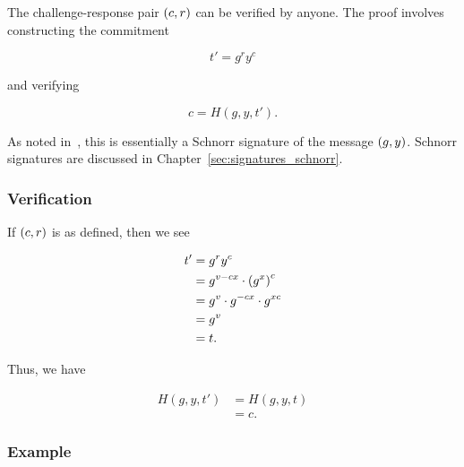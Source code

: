 The challenge-response pair $\left( c,r \right)$ can be verified by anyone.
The proof involves constructing the commitment

\begin{equation}
    t' = g^{r}y^{c}
\end{equation}

\noindent
and verifying

\begin{equation}
    c = H(g,y,t').
\end{equation}

\noindent
As noted in~\cite{GeneralDiscreteLogProofs},
this is essentially a Schnorr signature of the message $\left( g,y \right)$.
Schnorr signatures are discussed in Chapter~\ref{sec:signatures_schnorr}.

\subsubsection{Verification}

If $\left( c,r \right)$ is as defined, then we see

\begin{align}
    t' &= g^{r}y^{c}
            \nonumber\\
        &= g^{v-cx}\cdot\left( g^{x} \right)^{c}
            \nonumber\\
        &= g^{v}\cdot g^{-cx}\cdot g^{xc}
            \nonumber\\
        &= g^{v}
            \nonumber\\
        &= t.
\end{align}

\noindent
Thus, we have

\begin{align}
    H(g,y,t') &= H(g,y,t) \nonumber\\
        &= c.
\end{align}

\subsubsection{Example}

